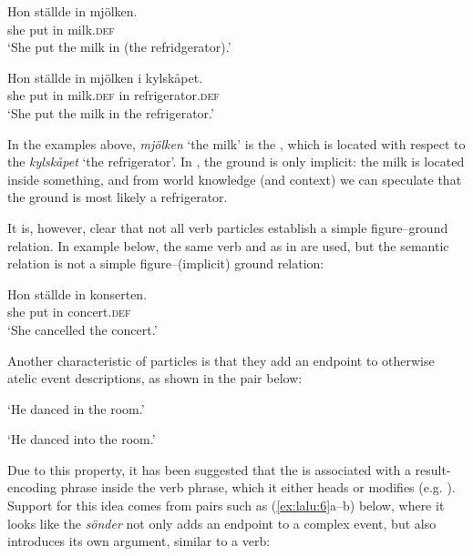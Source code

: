 \documentclass[output=paper]{langscibook}
\begin{document}
\ex\label{ex:lalu:3b}
\gll  Hon   ställde   in  mjölken.\\
  she   put     in   milk.\textsc{def} \\
  \glt `She put the milk in (the refridgerator).’

\ex\label{ex:lalu:3c}
\gll  Hon   ställde   in   mjölken     i     kylskåpet.\\
  she   put     in   milk.\textsc{def}     in     refrigerator.\textsc{def}\\
\glt    ‘She put the milk in the refrigerator.’

\z
\z


In the examples above, \textit{mjölken} ‘the milk’ is the , which is located with respect to the  \textit{kylskåpet} ‘the refrigerator’. In , the ground is only implicit: the milk is located inside something, and from world knowledge (and context) we can speculate that the ground is most likely a refrigerator.



It is, however, clear that not all verb particles establish a simple figure–ground relation. In example  below, the same verb and  as in  are used, but the semantic relation is not a simple figure--(implicit) ground relation:


\ea\label{ex:lalu:4}
\gll  Hon   ställde   in   konserten.\\
  she       put         in   concert.\textsc{def}\\
\glt `She cancelled the concert.'

\z

Another characteristic of particles is that they add an endpoint to otherwise atelic event descriptions, as shown in the pair below:


\ea\label{ex:lalu:5}
\glt `He danced in the room.'

\glt `He danced into the room.'

\z
\z

Due to this property, it has been suggested that the  is associated with a result-encoding phrase inside the verb phrase, which it either heads or modifies (e.g. \citealt{RamchandSvenonius2002}). Support for this idea comes from pairs such as (\ref{ex:lalu:6}a–b) below, where it looks like the  \textit{sönder} not only adds an endpoint to a complex event, but also introduces its own argument, similar to a verb:
\end{document}
